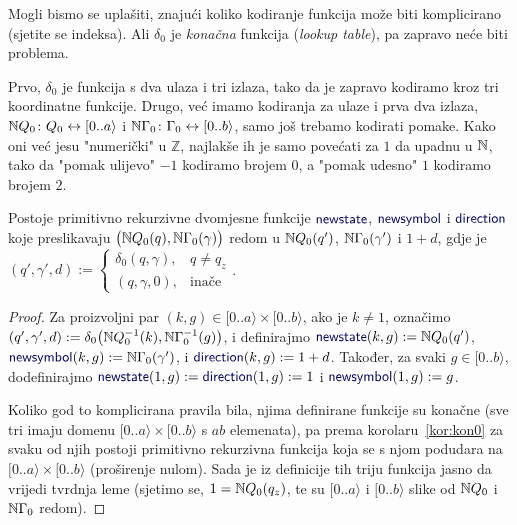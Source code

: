 Mogli bismo se uplašiti, znajući koliko kodiranje funkcija može biti komplicirano (sjetite se indeksa). Ali $\delta_0$ je \emph{konačna} funkcija (\emph{lookup table}), pa zapravo neće biti problema.

Prvo, $\delta_0$ je funkcija s dva ulaza i tri izlaza, tako da je zapravo kodiramo kroz tri koordinatne funkcije. Drugo, već imamo kodiranja za ulaze i prva dva izlaza, ${\mathbb N} Q_0\colon Q_0\leftrightarrow[0..a\rangle$ i ${\mathbb N}\Gamma_0\colon\Gamma_0\leftrightarrow[0..b\rangle$, samo još trebamo kodirati pomake. Kako oni već jesu "numerički" u $\mathbb Z$, najlakše ih je samo povećati za $1$ da upadnu u ${\mathbb N}$, tako da "pomak ulijevo" $-1$ kodiramo brojem $0$, a "pomak udesno" $1$ kodiramo brojem $2$.

\begin{lema}[{name=[primitivna rekurzivnost funkcije prijelaza]}]\label{lm:newssdprn}
Postoje primitivno rekurzivne dvomjesne funkcije $\f{newstate}$, $\f{newsymbol}$ i $\f{direction}$ koje preslikavaju $\bigl({\mathbb N} Q_0(q),{\mathbb N}\Gamma_0(\gamma)\bigr)$ redom u ${\mathbb N} Q_0(q')$, ${\mathbb N}\Gamma_0(\gamma')$ i $1+d$, gdje je 
$(q',\gamma',d):=\begin{cases}
\delta_0(q,\gamma),& q\not=q_z\\
(q,\gamma,0),&\text{inače}\end{cases}$.
\end{lema}
\begin{proof}
Za proizvoljni par $(k,g)\in[0..a\rangle\times[0..b\rangle$, ako je $k\not=1$, označimo $(q',\gamma',d):=\delta_0\bigl({\mathbb N} Q_0^{-1}(k),{\mathbb N}\Gamma_0^{-1}(g)\bigr)$, i definirajmo $\f{newstate}(k,g):=\N Q_0(q')$, $\f{newsymbol}(k,g):=\N\Gamma_0(\gamma')$, i $\f{direction}(k,g):=1+d$. Također, za svaki $g\in[0..b\rangle$, dodefinirajmo $\f{newstate}(1,g):=\f{direction}(1,g):=1$ i $\f{newsymbol}(1,g):=g$.

Koliko god to komplicirana pravila bila, njima definirane funkcije su konačne (sve tri imaju domenu $[0..a\rangle\times[0..b\rangle$ s $ab$ elemenata), pa prema korolaru~\ref{kor:kon0} za svaku od njih postoji primitivno rekurzivna funkcija koja se s njom podudara na $[0..a\rangle\times[0..b\rangle$ (proširenje nulom). Sada je iz definicije tih triju funkcija jasno da vrijedi tvrdnja leme (sjetimo se, $1={\mathbb N} Q_0(q_z)$, te su $[0..a\rangle$ i $[0..b\rangle$ slike od ${\mathbb N} Q_0$ i ${\mathbb N}\Gamma_0$ redom).
\end{proof}

